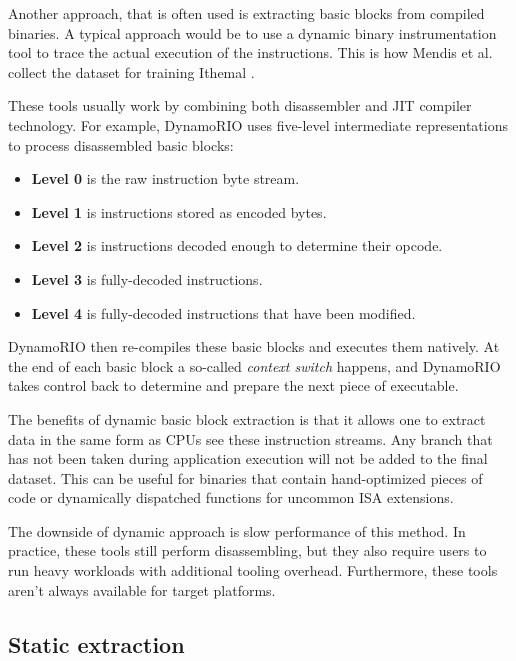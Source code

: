 Another approach, that is often used is extracting basic blocks from compiled binaries. A typical 
approach would be to use a dynamic binary instrumentation tool to trace the actual execution of the 
instructions. This is how Mendis et al. collect the dataset for training 
Ithemal \cite{mendisIthemalAccuratePortable2019}.

These tools usually work by combining both disassembler and JIT compiler technology. For example, 
DynamoRIO uses five-level intermediate representations to process disassembled basic blocks:
\begin{itemize}
	\item \textbf{Level 0} is the raw instruction byte stream.
	\item \textbf{Level 1} is instructions stored as encoded bytes.
	\item \textbf{Level 2} is instructions decoded enough to determine their opcode.
	\item \textbf{Level 3} is fully-decoded instructions.
	\item \textbf{Level 4} is fully-decoded instructions that have been modified.
\end{itemize}
DynamoRIO then re-compiles these basic blocks and executes them natively. At the end of each basic 
block a so-called \textit{context switch} happens, and DynamoRIO takes control back to determine and 
prepare the next piece of executable.

The benefits of dynamic basic block extraction is that it allows one to extract data in the same form as 
CPUs see these instruction streams. Any branch that has not been taken during application execution 
will not be added to the final dataset. This can be useful for binaries that contain hand-optimized 
pieces of code or dynamically dispatched functions for uncommon ISA extensions.

The downside of dynamic approach is slow performance of this method. In practice, these tools still 
perform disassembling, but they also require users to run heavy workloads with additional tooling 
overhead. Furthermore, these tools aren't always available for target platforms.

\subsection{Static extraction}

